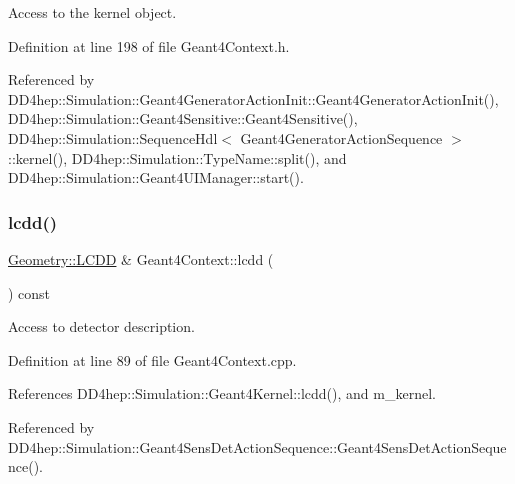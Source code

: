 Access to the kernel object. 



Definition at line 198 of file Geant4\+Context.\+h.



Referenced by D\+D4hep\+::\+Simulation\+::\+Geant4\+Generator\+Action\+Init\+::\+Geant4\+Generator\+Action\+Init(), D\+D4hep\+::\+Simulation\+::\+Geant4\+Sensitive\+::\+Geant4\+Sensitive(), D\+D4hep\+::\+Simulation\+::\+Sequence\+Hdl$<$ Geant4\+Generator\+Action\+Sequence $>$\+::kernel(), D\+D4hep\+::\+Simulation\+::\+Type\+Name\+::split(), and D\+D4hep\+::\+Simulation\+::\+Geant4\+U\+I\+Manager\+::start().

\hypertarget{class_d_d4hep_1_1_simulation_1_1_geant4_context_a209ec3ce0935cf5ac3734626c2eca1d3}{}\label{class_d_d4hep_1_1_simulation_1_1_geant4_context_a209ec3ce0935cf5ac3734626c2eca1d3} 
\subsubsection{\texorpdfstring{lcdd()}{lcdd()}}
{\footnotesize\ttfamily \hyperlink{class_d_d4hep_1_1_geometry_1_1_l_c_d_d}{Geometry\+::\+L\+C\+DD} \& Geant4\+Context\+::lcdd (\begin{DoxyParamCaption}{ }\end{DoxyParamCaption}) const}



Access to detector description. 



Definition at line 89 of file Geant4\+Context.\+cpp.



References D\+D4hep\+::\+Simulation\+::\+Geant4\+Kernel\+::lcdd(), and m\+\_\+kernel.



Referenced by D\+D4hep\+::\+Simulation\+::\+Geant4\+Sens\+Det\+Action\+Sequence\+::\+Geant4\+Sens\+Det\+Action\+Sequence().

\hypertarget{class_d_d4hep_1_1_simulation_1_1_geant4_context_a4d61ebf8b11ae03c9693a4c813475b5c}{}\label{class_d_d4hep_1_1_simulation_1_1_geant4_context_a4d61ebf8b11ae03c9693a4c813475b5c} 
